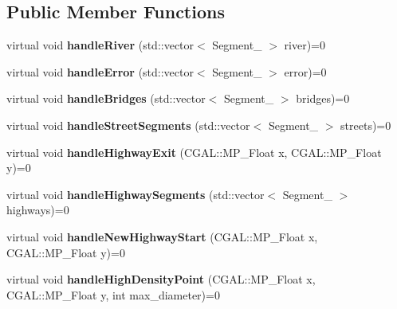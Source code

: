 \subsection*{Public Member Functions}
\begin{DoxyCompactItemize}
\item 
\hypertarget{class_i_interpretable_a111c0b6ed22d2ab516c6ca3fbd709a63}{}\label{class_i_interpretable_a111c0b6ed22d2ab516c6ca3fbd709a63} 
virtual void {\bfseries handle\+River} (std\+::vector$<$ Segment\+\_ $>$ river)=0
\item 
\hypertarget{class_i_interpretable_adfa70e9492340b2095c682dca05b9227}{}\label{class_i_interpretable_adfa70e9492340b2095c682dca05b9227} 
virtual void {\bfseries handle\+Error} (std\+::vector$<$ Segment\+\_ $>$ error)=0
\item 
\hypertarget{class_i_interpretable_a3f7441857e03e16a2ffaaaf214249839}{}\label{class_i_interpretable_a3f7441857e03e16a2ffaaaf214249839} 
virtual void {\bfseries handle\+Bridges} (std\+::vector$<$ Segment\+\_ $>$ bridges)=0
\item 
\hypertarget{class_i_interpretable_aa857e725bb0d2f82a0ee47758bfb1005}{}\label{class_i_interpretable_aa857e725bb0d2f82a0ee47758bfb1005} 
virtual void {\bfseries handle\+Street\+Segments} (std\+::vector$<$ Segment\+\_ $>$ streets)=0
\item 
\hypertarget{class_i_interpretable_a7d266b1337d81a3faca42b987293fb9a}{}\label{class_i_interpretable_a7d266b1337d81a3faca42b987293fb9a} 
virtual void {\bfseries handle\+Highway\+Exit} (C\+G\+A\+L\+::\+M\+P\+\_\+\+Float x, C\+G\+A\+L\+::\+M\+P\+\_\+\+Float y)=0
\item 
\hypertarget{class_i_interpretable_ac1a4695ce8a38f30c72444964528f66f}{}\label{class_i_interpretable_ac1a4695ce8a38f30c72444964528f66f} 
virtual void {\bfseries handle\+Highway\+Segments} (std\+::vector$<$ Segment\+\_ $>$ highways)=0
\item 
\hypertarget{class_i_interpretable_a2e4d9b4686ea4745b228f0455dbfb00c}{}\label{class_i_interpretable_a2e4d9b4686ea4745b228f0455dbfb00c} 
virtual void {\bfseries handle\+New\+Highway\+Start} (C\+G\+A\+L\+::\+M\+P\+\_\+\+Float x, C\+G\+A\+L\+::\+M\+P\+\_\+\+Float y)=0
\item 
\hypertarget{class_i_interpretable_a3f3973a2ab6bd88fe269e9cbb96424e1}{}\label{class_i_interpretable_a3f3973a2ab6bd88fe269e9cbb96424e1} 
virtual void {\bfseries handle\+High\+Density\+Point} (C\+G\+A\+L\+::\+M\+P\+\_\+\+Float x, C\+G\+A\+L\+::\+M\+P\+\_\+\+Float y, int max\+\_\+diameter)=0
\item 

\end{DoxyCompactItemize}
